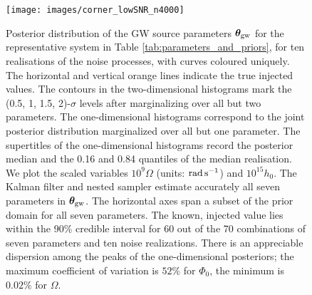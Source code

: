 \documentclass[fleqn,usenatbib,useAMS]{mnras}
\begin{document}
  

\begin{figure}
	\texttt{[image: images/corner\_lowSNR\_n4000]}
	\caption{Posterior distribution of the GW source parameters $\boldsymbol{\theta}_{\rm gw}$ for the representative system in Table \ref{tab:parameters_and_priors}, for ten realisations of the noise processes, with curves coloured uniquely. The horizontal and vertical orange lines indicate the true injected values. The contours in the two-dimensional histograms mark the (0.5, 1, 1.5, 2)-$\sigma$ levels after marginalizing over all but two parameters. The one-dimensional histograms correspond to the joint posterior distribution marginalized over all but one parameter. The supertitles of the one-dimensional histograms record the posterior median and the 0.16 and 0.84 quantiles of the median realisation. We plot the scaled variables $10^9 \Omega$ (units: ${\rm rad \, s^{-1}}$) and $10^{15} h_0$. The Kalman filter and nested sampler estimate accurately all seven parameters in ${\boldsymbol{\theta}}_{\rm gw}$. The horizontal axes span a subset of the prior domain for all seven parameters. The known, injected value lies within the 90\% credible interval for 60 out of the 70 combinations of seven parameters and ten noise realizations. There is an appreciable dispersion among the peaks of the one-dimensional posteriors; the maximum coefficient of variation is $52 \%$ for $\Phi_0$, the minimum is $0.02 \%$ for $\Omega$.}
	\label{fig:corner_plot_1}
\end{figure}
\end{document}
